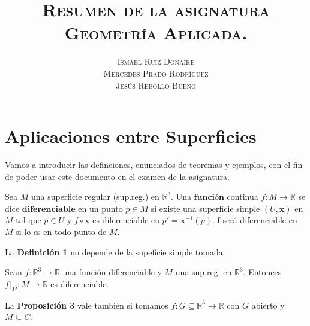 \documentclass[twoside]{report}
\title{\textsc{Resumen de la asignatura\\ Geometr\'{\i}a Aplicada.}}
\author{\textsc{Ismael Ruiz Donaire}\\ \textsc{Mercedes Prado Rodr\'{\i}guez}\\ \textsc{Jes\'us Rebollo Bueno}}
\date{}
\begin{document}
\maketitle{}




\chapter{Aplicaciones entre Superficies}

Vamos a introducir las definciones, enunciados de teoremas y ejemplos, con el fin de poder usar este documento en el examen de la asignatura.

\begin{defi}
Sea $M$ una superficie regular (sup.reg.) en $\mathbb{R}^3$. Una $\textbf{funci\'on}$ continua $f: M \rightarrow \mathbb{R}$ se dice $\textbf{diferenciable}$ en un punto $p \in M$ si existe una superficie simple $(U,\textbf{x})$ en $M$ tal que  $p \in U$ y $ f\circ \textbf{x}$ es diferenciable en $p' = \textbf{x}^{-1}(p)$. f ser\'a diferenciable en $M$ si lo es en todo punto de $M$.
\end{defi}

\begin{prop}
La \textup{\textbf{Definici\'on 1}} no depende de la supeficie simple tomada.
\end{prop}

\begin{prop}
Sean $f: \mathbb{R}^3 \rightarrow \mathbb{R}$ una funci\'on diferenciable y $M$ una sup.reg. en $\mathbb{R}^3$. Entonces $f\vert_M : M \rightarrow \mathbb{R}$ es diferenciable.
\end{prop}

\begin{nota}
La \textbf{Proposici\'on 3} vale tambi\'en si tomamos $f: G \subseteq \mathbb{R}^3 \rightarrow \mathbb{R}$ con $G$ abierto y $M\subseteq G$.
\end{nota}
\end{document}
